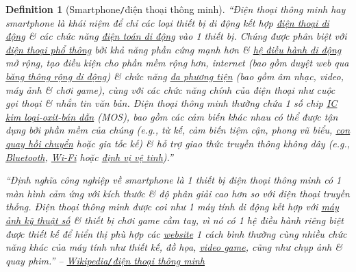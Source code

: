 \documentclass[12pt,oneside]{book}
\newtheorem{definition}{Definition}[section]
\begin{document}
\begin{definition}[Smartphone{\tt/}điện thoại thông minh]
	\label{def: smartphone}
	``\emph{Điện thoại thông minh} hay \emph{smartphone} là khái niệm để chỉ các loại thiết bị di động kết hợp \href{https://vi.wikipedia.org/wiki/%C4%90i%E1%BB%87n_tho%E1%BA%A1i_di_%C4%91%E1%BB%99ng}{điện thoại di động} \& các chức năng \href{https://vi.wikipedia.org/wiki/%C4%90i%E1%BB%87n_to%C3%A1n_di_%C4%91%E1%BB%99ng}{điện toán di động} vào 1 thiết bị. Chúng được phân biệt với \href{https://vi.wikipedia.org/wiki/%C4%90i%E1%BB%87n_tho%E1%BA%A1i_ph%E1%BB%95_th%C3%B4ng}{điện thoại phổ thông} bởi khả năng phần cứng mạnh hơn \& \href{https://vi.wikipedia.org/wiki/H%E1%BB%87_%C4%91i%E1%BB%81u_h%C3%A0nh_di_%C4%91%E1%BB%99ng}{hệ điều hành di động} mở rộng, tạo điều kiện cho phần mềm rộng hơn, internet (bao gồm duyệt web qua \href{https://vi.wikipedia.org/wiki/B%C4%83ng_th%C3%B4ng_r%E1%BB%99ng}{băng thông rộng di động}) \& chức năng \href{https://vi.wikipedia[11pt].org/wiki/%C4%90a_ph%C6%B0%C6%A1ng_ti%E1%BB%87n}{đa phương tiện} (bao gồm âm nhạc, video, máy ảnh \& chơi game), cùng với các chức năng chính của điện thoại như cuộc gọi thoại \& nhắn tin văn bản. Điện thoại thông minh thường chứa 1 số chip \href{https://vi.wikipedia.org/wiki/Vi_m%E1%BA%A1ch}{IC} \href{https://vi.wikipedia.org/wiki/MOSFET}{kim loại-oxit-bán dẫn} (MOS), bao gồm các cảm biến khác nhau có thể được tận dụng bởi phần mềm của chúng (e.g., từ kế, cảm biến tiệm cận, phong vũ biểu, \href{https://vi.wikipedia.org/wiki/Con_quay_h%E1%BB%93i_chuy%E1%BB%83n}{con quay hồi chuyển} hoặc gia tốc kế) \& hỗ trợ giao thức truyền thông không dây (e.g., \href{https://vi.wikipedia.org/wiki/Bluetooth}{Bluetooth}, \href{https://vi.wikipedia.org/wiki/Wi-Fi}{Wi-Fi} hoặc \href{https://vi.wikipedia.org/wiki/GNSS}{định vị vệ tinh}).''
	
	``Định nghĩa công nghiệp về smartphone là 1 thiết bị điện thoại thông minh có 1 màn hình cảm ứng với kích thước \& độ phân giải cao hơn so với điện thoại truyền thống. Điện thoại thông minh được coi như 1 máy tính di động kết hợp với \href{https://vi.wikipedia.org/wiki/M%C3%A1y_%E1%BA%A3nh_s%E1%BB%91}{máy ảnh kỹ thuật số} \& thiết bị chơi game cầm tay, vì nó có 1 hệ điều hành riêng biệt được thiết kế để hiển thị phù hợp các \href{https://vi.wikipedia.org/wiki/Website}{website} 1 cách bình thường cùng nhiều chức năng khác của máy tính như thiết kế, đồ họa, \href{https://vi.wikipedia.org/wiki/Tr%C3%B2_ch%C6%A1i_video}{video game}, cũng như chụp ảnh \& quay phim.'' -- \href{https://vi.wikipedia.org/wiki/%C4%90i%E1%BB%87n_tho%E1%BA%A1i_th%C3%B4ng_minh}{Wikipedia\emph{{\tt/}}điện thoại thông minh}
\end{definition}
\end{document}
